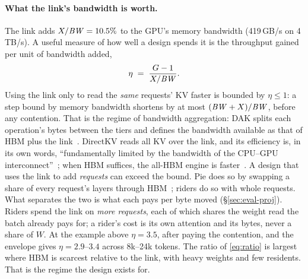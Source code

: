 \paragraph{What the link's bandwidth is worth.} The link adds $X/\mathit{BW}
= 10.5\%$ to the GPU's memory bandwidth (419\,GB/s on 4\,TB/s). A useful
measure of how well a design spends it is the throughput gained per unit of
bandwidth added,
\begin{equation}
  \eta \;=\; \frac{G - 1}{X/\mathit{BW}} .
  \label{eq:eta}
\end{equation}
Using the link only to read the \emph{same} requests' KV faster is bounded by
$\eta \le 1$: a step bound by memory bandwidth shortens by at most
$(\mathit{BW}+X)/\mathit{BW}$, before any contention. That is the regime
of bandwidth aggregation: DAK splits each operation's bytes between the tiers
and defines the bandwidth available as that of HBM plus the link~\cite{dak}.
DirectKV reads all KV over the link, and its efficiency is, in its own words,
``fundamentally limited by the bandwidth of the CPU--GPU
interconnect''~\cite{directkv}; when HBM suffices, the all-HBM engine is
faster~\cite{directkv}. A design that uses the link to add \emph{requests} can
exceed the bound. Pie does so by swapping a share of every request's layers
through HBM~\cite{pie}; riders do so with whole requests. What separates the
two is what each pays per byte moved (\S\ref{sec:eval-proj}).
Riders spend the link on \emph{more requests}, each of
which shares the weight read the batch already pays for; a rider's cost is its
own attention and its bytes, never a share of $W$. At the example above
$\eta = 3.5$, after paying the contention, and the envelope gives
$\eta = 2.9$--$3.4$ across 8k--24k tokens. The ratio of
\cref{eq:ratio} is largest where HBM is scarcest relative to the link, with
heavy weights and few residents. That is the regime the design exists for.

